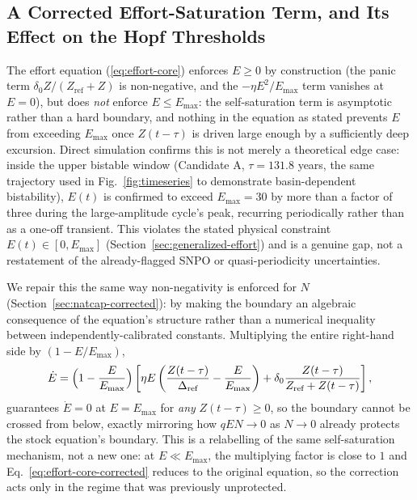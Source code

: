 \documentclass[twocolumn,10pt]{article}
\begin{document}
\subsection{A Corrected Effort-Saturation Term, and Its Effect on the Hopf Thresholds}
\label{sec:effort-saturation-fix}
The effort equation (\ref{eq:effort-core}) enforces $E\ge0$ by construction (the panic term $\delta_0 Z/(Z_{\text{ref}}+Z)$ is non-negative, and the $-\eta E^2/E_{\max}$ term vanishes at $E=0$), but does \emph{not} enforce $E\le E_{\max}$: the self-saturation term is asymptotic rather than a hard boundary, and nothing in the equation as stated prevents $E$ from exceeding $E_{\max}$ once $Z(t-\tau)$ is driven large enough by a sufficiently deep excursion. Direct simulation confirms this is not merely a theoretical edge case: inside the upper bistable window (Candidate A, $\tau=131.8$ years, the same trajectory used in Fig.~\ref{fig:timeseries} to demonstrate basin-dependent bistability), $E(t)$ is confirmed to exceed $E_{\max}=30$ by more than a factor of three during the large-amplitude cycle's peak, recurring periodically rather than as a one-off transient. This violates the stated physical constraint $E(t)\in[0,E_{\max}]$ (Section~\ref{sec:generalized-effort}) and is a genuine gap, not a restatement of the already-flagged SNPO or quasi-periodicity uncertainties.

We repair this the same way non-negativity is enforced for $N$ (Section~\ref{sec:natcap-corrected}): by making the boundary an algebraic consequence of the equation's structure rather than a numerical inequality between independently-calibrated constants. Multiplying the entire right-hand side by $(1-E/E_{\max})$,
\begin{equation}
\dot{E} = \Bigl(1-\frac{E}{E_{\max}}\Bigr)\left[\eta E \left( \frac{Z(t-\tau)}{\Delta_{\text{ref}}} - \frac{E}{E_{\max}} \right) + \delta_0 \frac{Z(t-\tau)}{Z_{\text{ref}} + Z(t-\tau)}\right],
\label{eq:effort-core-corrected}
\end{equation}
guarantees $\dot E=0$ at $E=E_{\max}$ for \emph{any} $Z(t-\tau)\ge0$, so the boundary cannot be crossed from below, exactly mirroring how $qEN\to0$ as $N\to0$ already protects the stock equation's boundary. This is a relabelling of the same self-saturation mechanism, not a new one: at $E\ll E_{\max}$, the multiplying factor is close to $1$ and Eq.~\eqref{eq:effort-core-corrected} reduces to the original equation, so the correction acts only in the regime that was previously unprotected.
\end{document}
